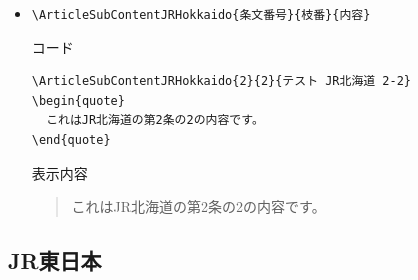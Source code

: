 \documentclass[oneside,10pt,a4paper]{jsarticle}
\begin{document}
\begin{itemize}
\begin{itembox}[l]{コード}
\begin{verbatim}
\ArticleContentJRHokkaido{2}{テスト JR北海道 2}
\begin{quote}
  これはJR北海道の第2条の内容です。
\end{quote}\end{verbatim}
      \end{itembox}
      \begin{itembox}[l]{表示内容}
        \begin{quote}
          これはJR北海道の第2条の内容です。
        \end{quote}
      \end{itembox}
    \item \verb|\ArticleSubContentJRHokkaido{条文番号}{枝番}{内容}|
      \begin{itembox}[l]{コード}
        \begin{verbatim}
\ArticleSubContentJRHokkaido{2}{2}{テスト JR北海道 2-2}
\begin{quote}
  これはJR北海道の第2条の2の内容です。
\end{quote}\end{verbatim}
      \end{itembox}
      \begin{itembox}[l]{表示内容}
        \begin{quote}
          これはJR北海道の第2条の2の内容です。
        \end{quote}
      \end{itembox}
  \end{itemize}
  \newpage

  \subsection{JR東日本}
\end{document}
